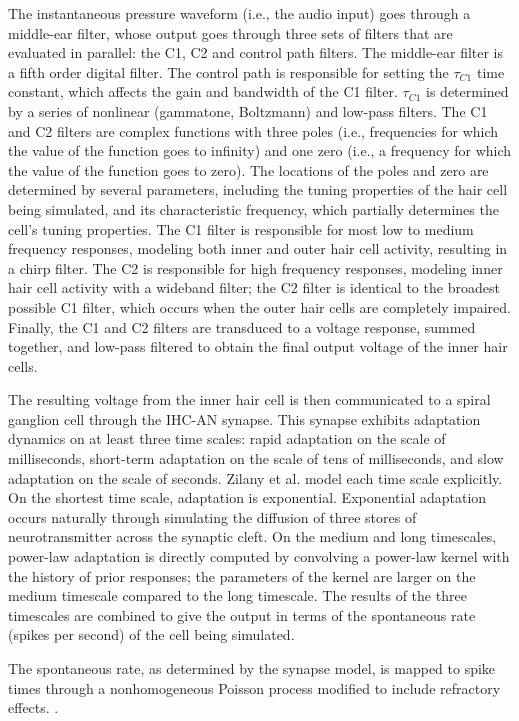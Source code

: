 \documentclass{article}
\begin{document}
The instantaneous pressure waveform
(i.e., the audio input)
goes through a middle-ear filter,
whose output goes through three sets of filters
that are evaluated in parallel:
the C1, C2 and control path filters.
The middle-ear filter is a fifth order digital filter.
The control path is responsible for
setting the $\tau_{C1}$ time constant,
which affects the gain and bandwidth
of the C1 filter.
$\tau_{C1}$ is determined by
a series of nonlinear
(gammatone, Boltzmann)
and low-pass filters.
The C1 and C2 filters are
complex functions with three poles
(i.e., frequencies for which the
value of the function goes to infinity)
and one zero (i.e., a frequency
for which the value of the function goes to zero).
The locations of the poles and zero
are determined by
several parameters, including
the tuning properties of
the hair cell being simulated,
and its characteristic frequency,
which partially determines the cell's
tuning properties.
The C1 filter is responsible for most
low to medium frequency responses,
modeling both inner and outer hair cell
activity, resulting in a chirp filter.
The C2 is responsible for high frequency responses,
modeling inner hair cell activity
with a wideband filter;
the C2 filter is identical
to the broadest possible C1 filter,
which occurs when the outer hair cells
are completely impaired.
Finally, the C1 and C2 filters
are transduced to a voltage response,
summed together, and low-pass filtered
to obtain the final output voltage
of the inner hair cells.

The resulting voltage from the inner hair cell
is then communicated to a spiral ganglion cell
through the IHC-AN synapse.
This synapse exhibits adaptation dynamics
on at least three time scales:
rapid adaptation on the scale of milliseconds,
short-term adaptation on the scale of tens of milliseconds,
and slow adaptation on the scale of seconds.
Zilany et al. model each time scale explicitly.
On the shortest time scale,
adaptation is exponential.
Exponential adaptation occurs naturally
through simulating the diffusion
of three stores of neurotransmitter
across the synaptic cleft.
On the medium and long timescales,
power-law adaptation is directly computed
by convolving a power-law kernel with
the history of prior responses;
the parameters of the kernel
are larger on the medium timescale
compared to the long timescale.
The results of the three timescales
are combined to give the output
in terms of the spontaneous rate
(spikes per second) of the cell being simulated.

The spontaneous rate,
as determined by the synapse model,
is mapped to spike times
through a nonhomogeneous Poisson process
modified to include refractory effects.
\cite{zhang2001}.
\end{document}

